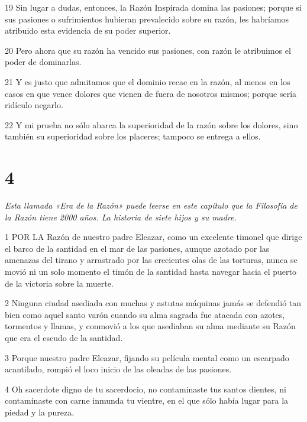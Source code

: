 \par 19 Sin lugar a dudas, entonces, la Razón Inspirada domina las pasiones; porque si sus pasiones o sufrimientos hubieran prevalecido sobre su razón, les habríamos atribuido esta evidencia de su poder superior.

\par 20 Pero ahora que su razón ha vencido sus pasiones, con razón le atribuimos el poder de dominarlas.

\par 21 Y es justo que admitamos que el dominio recae en la razón, al menos en los casos en que vence dolores que vienen de fuera de nosotros mismos; porque sería ridículo negarlo.

\par 22 Y mi prueba no sólo abarca la superioridad de la razón sobre los dolores, sino también su superioridad sobre los placeres; tampoco se entrega a ellos.

\chapter{4}

\par \textit{Esta llamada «Era de la Razón» puede leerse en este capítulo que la Filosofía de la Razón tiene 2000 años. La historia de siete hijos y su madre.}

\par 1 POR LA Razón de nuestro padre Eleazar, como un excelente timonel que dirige el barco de la santidad en el mar de las pasiones, aunque azotado por las amenazas del tirano y arrastrado por las crecientes olas de las torturas, nunca se movió ni un solo momento el timón de la santidad hasta navegar hacia el puerto de la victoria sobre la muerte.

\par 2 Ninguna ciudad asediada con muchas y astutas máquinas jamás se defendió tan bien como aquel santo varón cuando su alma sagrada fue atacada con azotes, tormentos y llamas, y conmovió a los que asediaban su alma mediante su Razón que era el escudo de la santidad.

\par 3 Porque nuestro padre Eleazar, fijando su película mental como un escarpado acantilado, rompió el loco inicio de las oleadas de las pasiones.

\par 4 Oh sacerdote digno de tu sacerdocio, no contaminaste tus santos dientes, ni contaminaste con carne inmunda tu vientre, en el que sólo había lugar para la piedad y la pureza.

